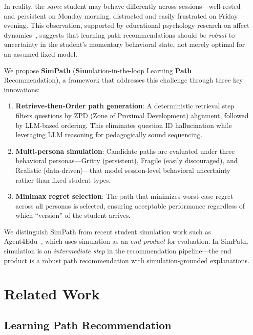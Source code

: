 \documentclass[runningheads]{llncs}
\begin{document}
In reality, the \emph{same} student may behave differently across sessions---well-rested and persistent on Monday morning, distracted and easily frustrated on Friday evening.
This observation, supported by educational psychology research on affect dynamics~\cite{pekrun2006}, suggests that learning path recommendations should be \emph{robust} to uncertainty in the student's momentary behavioral state, not merely optimal for an assumed fixed model.

We propose \textbf{SimPath} (\textbf{Sim}ulation-in-the-loop Learning \textbf{Path} Recommendation), a framework that addresses this challenge through three key innovations:

\begin{enumerate}
\item \textbf{Retrieve-then-Order path generation}: A deterministic retrieval step filters questions by ZPD (Zone of Proximal Development) alignment, followed by LLM-based ordering. This eliminates question ID hallucination while leveraging LLM reasoning for pedagogically sound sequencing.

\item \textbf{Multi-persona simulation}: Candidate paths are evaluated under three behavioral personas---Gritty (persistent), Fragile (easily discouraged), and Realistic (data-driven)---that model session-level behavioral uncertainty rather than fixed student types.

\item \textbf{Minimax regret selection}: The path that minimizes worst-case regret across all personas is selected, ensuring acceptable performance regardless of which ``version'' of the student arrives.
\end{enumerate}

We distinguish SimPath from recent student simulation work such as Agent4Edu~\cite{agent4edu2025}, which uses simulation as an \emph{end product} for evaluation.
In SimPath, simulation is an \emph{intermediate step} in the recommendation pipeline---the end product is a robust path recommendation with simulation-grounded explanations.

\section{Related Work}

\subsection{Learning Path Recommendation}
\end{document}
